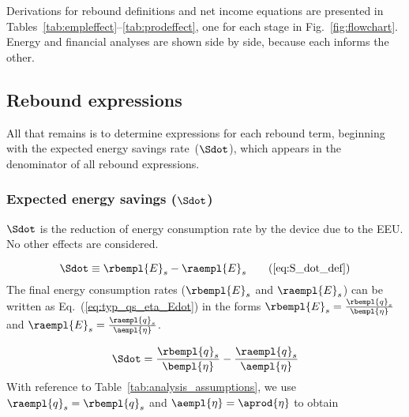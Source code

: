 Derivations for rebound definitions and net income equations
are presented in Tables~\ref{tab:empleffect}--\ref{tab:prodeffect},
one for each stage in Fig.~\ref{fig:flowchart}.
Energy and financial analyses are shown side by side, because
each informs the other.














\subsection{Rebound expressions}
\label{sec:rebound_expressions}

All that remains is to determine expressions for each rebound term, 
beginning with the expected energy savings rate~($\Sdot$), which
appears in the denominator of all rebound expressions.


\subsubsection{Expected energy savings ($\Sdot$)} 
\label{sec:Sdot}

$\Sdot$ is the reduction of energy consumption rate
by the device due to the EEU.
No other effects are considered.

\begin{equation}
  \Sdot \equiv \rbempl{E}_s - \raempl{E}_s  \tag{\ref{eq:S_dot_def}}
\end{equation}
%
The final energy consumption rates ($\rbempl{E}_s$ and $\raempl{E}_s$) 
can be written as Eq.~(\ref{eq:typ_qs_eta_Edot}) in the forms
$\rbempl{E}_s = \frac{\rbempl{q}_s}{\bempl{\eta}}$ and 
$\raempl{E}_s = \frac{\raempl{q}_s}{\aempl{\eta}}$. 

\begin{equation}
  \Sdot = \frac{\rbempl{q}_s}{\bempl{\eta}} - \frac{\raempl{q}_s}{\aempl{\eta}}
\end{equation}
%
With reference to Table~\ref{tab:analysis_assumptions}, 
we use $\raempl{q}_s = \rbempl{q}_s$ and $\aempl{\eta} = \aprod{\eta}$ to obtain

